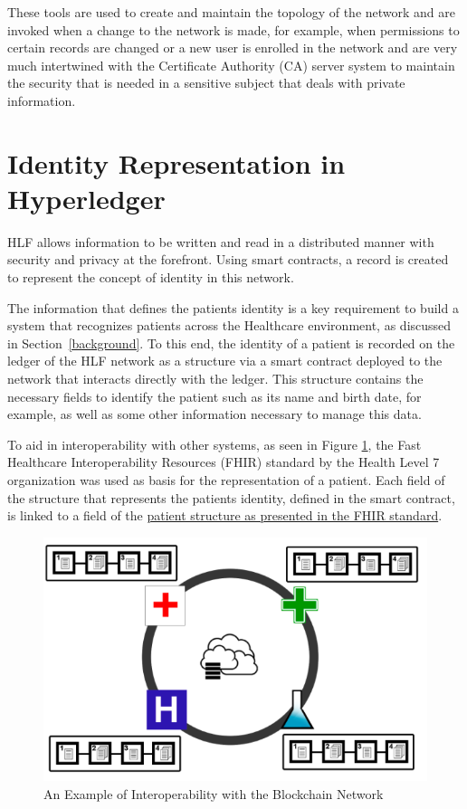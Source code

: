 These tools are used to create and maintain the topology of the network and are
invoked when a change to the network is made, for example, when permissions to
certain records are changed or a new user is enrolled in the network and are
very much intertwined with the Certificate Authority (CA) server system to
maintain the security that is needed in a sensitive subject that deals with
private information.

\section{Identity Representation in Hyperledger}
 
HLF allows information to be written and read in a distributed manner with
security and privacy at the forefront. Using smart contracts, a record is
created to represent the concept of identity in this network.

The information that defines the patients identity is a key requirement to
build a system that recognizes patients across the Healthcare environment, as
discussed in Section~\ref{background}.  To this end, the identity of a patient
is recorded on the ledger of the HLF network as a structure via a smart
contract deployed to the network that interacts directly with the ledger.  This
structure contains the necessary fields to identify the patient such as its
name and birth date, for example, as well as some other information necessary
to manage this data. 

To aid in interoperability with other systems, as seen in Figure
\ref{fig:interoperability}, the Fast Healthcare Interoperability Resources
(FHIR) standard by the Health Level 7 organization was used as basis for the
representation of a patient.  Each field of the structure that represents the
patients identity, defined in the smart contract, is linked to a field of the
\href{http://www.hl7.org/fhir/patient.html}{patient structure as presented in
the FHIR standard}.

\begin{figure}[ht]
\centering
\includegraphics[width=0.7\linewidth]{imgs/interoperability.png}
\caption{\label{fig:interoperability}An Example of Interoperability with the Blockchain Network}
\end{figure}

